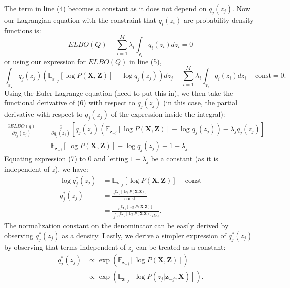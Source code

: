 \documentclass[a4paper,12pt]{article}
\numberwithin{equation}{section}
\begin{document}
The term in line (4) becomes a constant as it does not depend on $q_j(z_j)$. Now our Lagrangian equation with the constraint that $q_i(z_i)$ are probability density functions is:
\begin{equation*}
ELBO(Q)-\sum^M_{i=1}\lambda_i\int_\mathcal{z_i}q_i(z_i)dz_i=0
\end{equation*}
or using our expression for $ELBO(Q)$ in line (5),
\begin{equation}
\int_\mathcal{z_j}q_j(z_j)\left(\mathbb{E}_{\mathcal{z}_{-j}}[\log P(\textbf{X},\textbf{Z})]-\log q_j(z_j)\right)dz_j-\sum^M_{i=1}\lambda_i\int_\mathcal{z_i}q_i(z_i)dz_i+\text{const}=0.
\end{equation}
Using the Euler-Lagrange equation (need to put this in), we then take the functional derivative of (6) with respect to $q_j(z_j)$ (in this case, the partial derivative with respect to $q_j(z_j)$ of the expression inside the integral):
\begin{align}
\frac{\partial ELBO(q)}{\partial q_j(z_j)}&= \frac{\partial}{\partial q_j(z_j)}\left[q_j(z_j)\left(\mathbb{E}_{\textbf{z}_{-j}}[\log P(\textbf{X},\textbf{Z})]-\log q_j(z_j)\right)-\lambda_jq_j(z_j)\right]\nonumber
\\&= \mathbb{E}_{\textbf{z}_{-j}}[\log P(\textbf{X},\textbf{Z})]-\log q_j(z_j)-1-\lambda_j
\end{align}
Equating expression (7) to 0 and letting $1+\lambda_j$ be a constant (as it is independent of $z$), we have:
\begin{align*}
\log q_j^*(z_j)&= \mathbb{E}_{\textbf{z}_{-j}}[\log P(\textbf{X},\textbf{Z})]-\text{const}\\
q_j^*(z_j)&=\frac{e^{\mathbb{E}_{\textbf{z}_{-j}}[\log P(\textbf{X},\textbf{Z})]}}{\text{const}}\\
&= \frac{e^{\mathbb{E}_{\textbf{z}_{-j}}[\log P(\textbf{X},\textbf{Z})]}}{\int e^{\mathbb{E}_{\textbf{z}_{-j}}[\log P(\textbf{X},\textbf{Z})]}dz_j}.
\end{align*}
The normalization constant on the denominator can be easily derived by observing $q^*_j(z_j)$ as a density. Lastly, we derive a simpler expression of $q^*_j(z_j)$ by observing that terms independent of $z_j$ can be treated as a constant:
\begin{align}
q^*_j(z_j)&\propto \exp\left(\mathbb{E}_{\textbf{z}_{-j}}[\log P(\textbf{X},\textbf{Z})]\right)\nonumber\\
&\propto \exp\left(\mathbb{E}_{\textbf{z}_{-j}}[\log P(z_j|\textbf{z}_{-j},\textbf{X})]\right).
\end{align}
\end{document}
